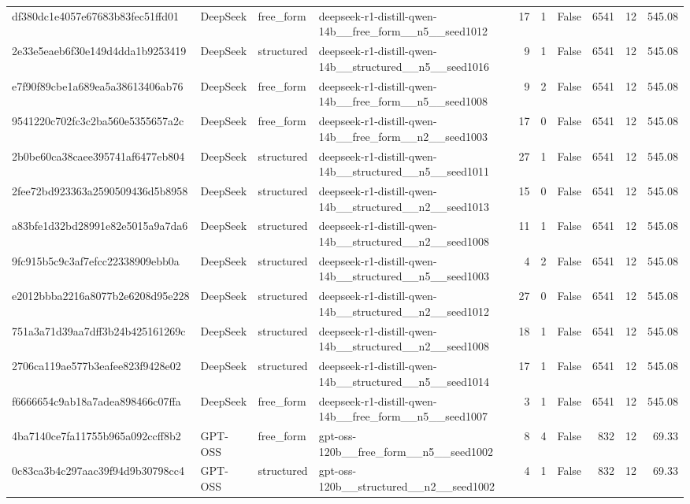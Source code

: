 \begin{longtable}{llllrrrrrr}
df380dc1e4057e67683b83fec51ffd01 & DeepSeek & free\_form & deepseek-r1-distill-qwen-14b\_\_free\_form\_\_n5\_\_seed1012 & 17 & 1 & False & 6541 & 12 & 545.08 \\
2e33e5eaeb6f30e149d4dda1b9253419 & DeepSeek & structured & deepseek-r1-distill-qwen-14b\_\_structured\_\_n5\_\_seed1016 & 9 & 1 & False & 6541 & 12 & 545.08 \\
e7f90f89cbe1a689ea5a38613406ab76 & DeepSeek & free\_form & deepseek-r1-distill-qwen-14b\_\_free\_form\_\_n5\_\_seed1008 & 9 & 2 & False & 6541 & 12 & 545.08 \\
9541220c702fc3c2ba560e5355657a2c & DeepSeek & free\_form & deepseek-r1-distill-qwen-14b\_\_free\_form\_\_n2\_\_seed1003 & 17 & 0 & False & 6541 & 12 & 545.08 \\
2b0be60ca38caee395741af6477eb804 & DeepSeek & structured & deepseek-r1-distill-qwen-14b\_\_structured\_\_n5\_\_seed1011 & 27 & 1 & False & 6541 & 12 & 545.08 \\
2fee72bd923363a2590509436d5b8958 & DeepSeek & structured & deepseek-r1-distill-qwen-14b\_\_structured\_\_n2\_\_seed1013 & 15 & 0 & False & 6541 & 12 & 545.08 \\
a83bfe1d32bd28991e82e5015a9a7da6 & DeepSeek & structured & deepseek-r1-distill-qwen-14b\_\_structured\_\_n2\_\_seed1008 & 11 & 1 & False & 6541 & 12 & 545.08 \\
9fc915b5c9c3af7efcc22338909ebb0a & DeepSeek & structured & deepseek-r1-distill-qwen-14b\_\_structured\_\_n5\_\_seed1003 & 4 & 2 & False & 6541 & 12 & 545.08 \\
e2012bbba2216a8077b2e6208d95e228 & DeepSeek & structured & deepseek-r1-distill-qwen-14b\_\_structured\_\_n2\_\_seed1012 & 27 & 0 & False & 6541 & 12 & 545.08 \\
751a3a71d39aa7dff3b24b425161269c & DeepSeek & structured & deepseek-r1-distill-qwen-14b\_\_structured\_\_n2\_\_seed1008 & 18 & 1 & False & 6541 & 12 & 545.08 \\
2706ca119ae577b3eafee823f9428e02 & DeepSeek & structured & deepseek-r1-distill-qwen-14b\_\_structured\_\_n5\_\_seed1014 & 17 & 1 & False & 6541 & 12 & 545.08 \\
f6666654c9ab18a7adea898466c07ffa & DeepSeek & free\_form & deepseek-r1-distill-qwen-14b\_\_free\_form\_\_n5\_\_seed1007 & 3 & 1 & False & 6541 & 12 & 545.08 \\
4ba7140ce7fa11755b965a092ccff8b2 & GPT-OSS & free\_form & gpt-oss-120b\_\_free\_form\_\_n5\_\_seed1002 & 8 & 4 & False & 832 & 12 & 69.33 \\
0c83ca3b4c297aac39f94d9b30798cc4 & GPT-OSS & structured & gpt-oss-120b\_\_structured\_\_n2\_\_seed1002 & 4 & 1 & False & 832 & 12 & 69.33 \\

\end{longtable}
